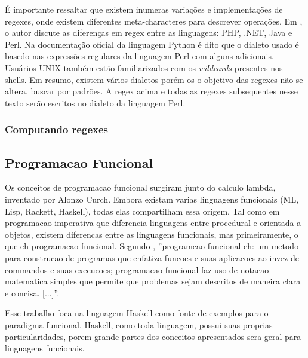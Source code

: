 É importante ressaltar que existem inumeras variações e implementações de regexes, onde existem diferentes meta-characteres para descrever operações.
Em \cite{mastering}, o autor discute as diferenças em regex entre as linguagens: PHP, .NET, Java e Perl.
Na documentação oficial da linguagem Python \cite{python-re} é dito que o dialeto usado é basedo nas expressões regulares da linguagem Perl com alguns adicionais.
Usuários UNIX também estão familiarizados com os \emph{wildcards} presentes nos shells.
Em resumo, existem vários dialetos porém os o objetivo das regexes não se altera, buscar por padrões.
A regex acima e todas as regexes subsequentes nesse texto serão escritos no dialeto da linguagem Perl. 

\subsubsection{Computando regexes}



\subsection{Programacao Funcional}

Os conceitos de programacao funcional surgiram junto do calculo lambda, inventado por Alonzo Curch.
Embora existam varias linguagens funcionais (ML, Lisp, Rackett, Haskell), todas elas compartilham essa origem.
Tal como em programacao imperativa que diferencia linguagens entre procedural e orientada a objetos, existem diferencas entre as linguagens funcionais, mas primeiramente, o que eh programacao funcional.
Segundo \cite{Bird}, ''programcao funcional eh: um metodo para construcao de programas que enfatiza funcoes e suas aplicacoes ao invez de commandos e suas execucoes; programacao funcional faz uso de notacao matematica simples que permite que problemas sejam descritos de maneira clara e concisa. [...]''.

Esse trabalho foca na linguagem Haskell como fonte de exemplos para o paradigma funcional.
Haskell, como toda linguagem, possui suas proprias particularidades, porem grande partes dos conceitos apresentados sera geral para linguagens funcionais.

